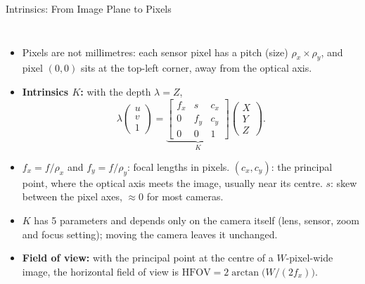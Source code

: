 \begin{frame}{Intrinsics: From Image Plane to Pixels}
  \begin{columns}[T,onlytextwidth]
      \begin{itemize}\footnotesize\itemsep0.3em
        \item Pixels are not millimetres: each sensor pixel has a pitch (size) $\rho_x\times\rho_y$, and pixel $(0,0)$ sits at the top-left corner, away from the optical axis.
        \item \textbf{Intrinsics $K$:} with the depth $\lambda=Z$,
        \[ \lambda\begin{pmatrix}u\\ v\\ 1\end{pmatrix} = \underbrace{\begin{bmatrix} f_x & s & c_x\\ 0 & f_y & c_y\\ 0&0&1\end{bmatrix}}_{K}\begin{pmatrix}X\\ Y\\ Z\end{pmatrix}. \]
        \item $f_x=f/\rho_x$ and $f_y=f/\rho_y$: focal lengths in pixels. $(c_x,c_y)$: the principal point, where the optical axis meets the image, usually near its centre. $s$: skew between the pixel axes, $\approx0$ for most cameras.
        \item $K$ has 5 parameters and depends only on the camera itself (lens, sensor, zoom and focus setting); moving the camera leaves it unchanged.
        \item \textbf{Field of view:} with the principal point at the centre of a $W$-pixel-wide image, the horizontal field of view is $\mathrm{HFOV}=2\arctan\!\big(W/(2f_x)\big)$.
      \end{itemize}
      \centering
      \vspace{0.5em}
\end{columns}
\end{frame}
